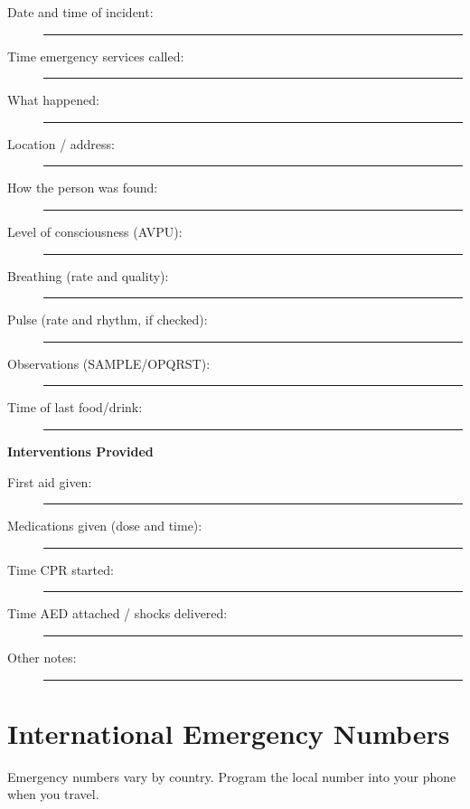 \begin{description}
  \item[Date and time of incident:] \rule{0.42\textwidth}{0.4pt}
  \item[Time emergency services called:] \rule{0.32\textwidth}{0.4pt}
  \item[What happened:] \rule{0.68\textwidth}{0.4pt}
  \item[Location / address:] \rule{0.55\textwidth}{0.4pt}
  \item[How the person was found:] \rule{0.5\textwidth}{0.4pt}
  \item[Level of consciousness (AVPU):] \rule{0.45\textwidth}{0.4pt}
  \item[Breathing (rate and quality):] \rule{0.45\textwidth}{0.4pt}
  \item[Pulse (rate and rhythm, if checked):] \rule{0.38\textwidth}{0.4pt}
  \item[Observations (SAMPLE/OPQRST):] \rule{0.4\textwidth}{0.4pt}
  \item[Time of last food/drink:] \rule{0.45\textwidth}{0.4pt}
\end{description}

\textbf{Interventions Provided}

\begin{description}
  \item[First aid given:] \rule{0.65\textwidth}{0.4pt}
  \item[Medications given (dose and time):] \rule{0.4\textwidth}{0.4pt}
  \item[Time CPR started:] \rule{0.5\textwidth}{0.4pt}
  \item[Time AED attached / shocks delivered:] \rule{0.3\textwidth}{0.4pt}
  \item[Other notes:] \rule{0.72\textwidth}{0.4pt}
\end{description}


\section{International Emergency Numbers}

Emergency numbers vary by country. Program the local number into your phone when you travel.

